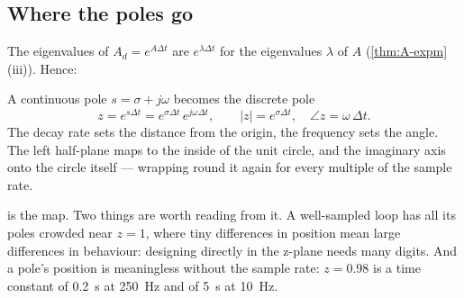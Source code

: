 \subsection{Where the poles go}
The eigenvalues of $A_d = e^{A\Delta t}$ are $e^{\lambda\Delta t}$ for the eigenvalues $\lambda$ of $A$ (\cref{thm:A-expm}\,(iii)). Hence:

\begin{result}
A continuous pole $s = \sigma + j\omega$ becomes the discrete pole
\begin{equation}\label{eq:D-map}
  z = e^{s\Delta t} = e^{\sigma\Delta t}\,e^{j\omega\Delta t}, \qquad |z| = e^{\sigma\Delta t}, \quad \angle z = \omega\,\Delta t .
\end{equation}
The decay rate sets the distance from the origin, the frequency sets the angle. The left half-plane maps to the inside of the unit circle, and the imaginary axis onto the circle itself — wrapping round it again for every multiple of the sample rate.
\end{result}


 is the map. Two things are worth reading from it. A well-sampled loop has all its poles crowded near $z = 1$, where tiny differences in position mean large differences in behaviour: designing directly in the z-plane needs many digits. And a pole's position is meaningless without the sample rate: $z = 0.98$ is a time constant of \SI{0.2}{s} at \SI{250}{Hz} and of \SI{5}{s} at \SI{10}{Hz}.

